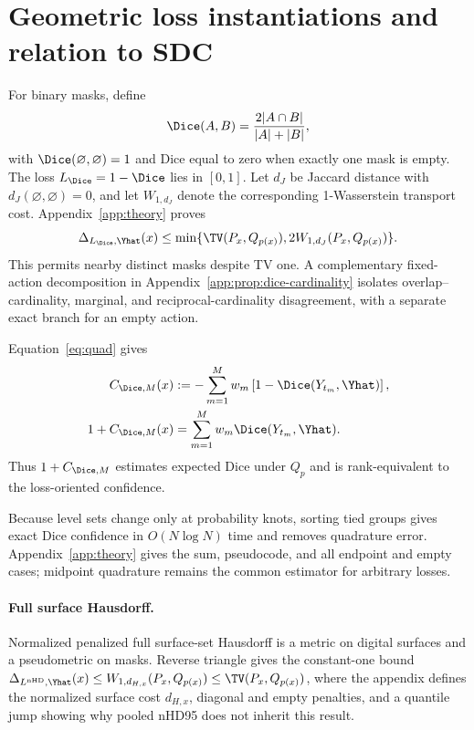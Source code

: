 \section{Geometric loss instantiations and relation to SDC}
\label{sec:theory}

For binary masks, define
\begin{equation*}
  \Dice(A,B)=\frac{2|A\cap B|}{|A|+|B|},
\end{equation*}
with \(\Dice(\varnothing,\varnothing)=1\) and Dice equal to zero when
exactly one mask is empty. The loss \(L_{\Dice}=1-\Dice\) lies in
\([0,1]\). Let \(d_J\) be Jaccard distance with
\(d_J(\varnothing,\varnothing)=0\), and let \(W_{1,d_J}\) denote the corresponding
1-Wasserstein transport cost. Appendix~\ref{app:theory} proves
\begin{equation*}
  \Delta_{L_{\Dice},\Yhat}(x)
  \leq\min\{\TV(P_x,Q_{p(x)}),2W_{1,d_J}(P_x,Q_{p(x)})\}.
\end{equation*}
This permits nearby distinct masks despite TV one. A complementary fixed-action
decomposition in Appendix~\ref{app:prop:dice-cardinality} isolates
overlap--cardinality, marginal, and reciprocal-cardinality disagreement, with a
separate exact branch for an empty action.

Equation~\eqref{eq:quad} gives
\begin{align*}
  C_{\Dice,M}(x)
  &:=-\sum_{m=1}^M w_m
      \left[1-\Dice(Y_{t_m},\Yhat)\right], \\
  1+C_{\Dice,M}(x)
  &=\sum_{m=1}^M w_m\Dice(Y_{t_m},\Yhat).
\end{align*}
Thus \(1+C_{\Dice,M}\) estimates expected Dice under \(Q_p\) and is
rank-equivalent to the loss-oriented confidence.

Because level sets change only at probability knots, sorting tied groups gives
exact Dice confidence in \(O(N\log N)\) time and removes quadrature error.
Appendix~\ref{app:theory} gives the sum, pseudocode, and all endpoint and empty
cases; midpoint quadrature remains the common estimator for arbitrary losses.

\paragraph{Full surface Hausdorff.}
Normalized penalized full surface-set Hausdorff is a metric on digital surfaces
and a pseudometric on masks. Reverse triangle gives the constant-one bound
\(\Delta_{L^{\mathrm{nHD}},\Yhat}(x)
\leq W_{1,d_{H,x}}(P_x,Q_{p(x)})
\leq\TV(P_x,Q_{p(x)})\), where the appendix defines the normalized surface cost
\(d_{H,x}\), diagonal and empty penalties, and a quantile jump showing why pooled
nHD95 does not inherit this result.

